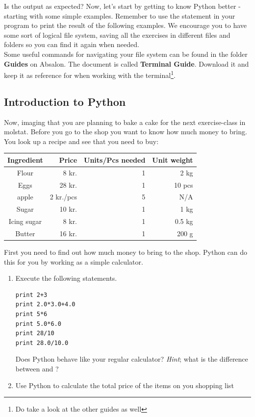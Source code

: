 \documentclass{article}
\begin{document}
Is the output as expected?
%
Now, let's start by getting to know Python better - starting with some simple examples. Remember to use the  statement in your program to print the result of the following examples.
We encourage you to have some sort of logical file system, saving all the exercises in different files and folders so you can find it again when needed. \\

Some useful commands for navigating your file system can be found in the folder \textbf{Guides} on Absalon.  The document is called \textbf{Terminal Guide}.
Download it and keep it as reference for when working with the terminal\footnote{Do take a look at the other guides as well}.\\

\subsection{Introduction to Python}

Now, imaging that you are planning to bake a cake for the next exercise-class in molstat.
Before you go to the shop you want to know how much money  to bring.
You look up a recipe and see that you need to buy:

\vspace{10pt }
 
\begin{center}
    \begin{tabular}{c r r r}
    \hline
    Ingredient & Price & Units/Pcs needed & Unit weight \\
    \hline
    Flour & 8 kr. & 1  & 2 kg \\
    Eggs & 28 kr. & 1  & 10 pcs \\
    apple & 2 kr./pcs & 5   & N/A\\
    Sugar & 10 kr.& 1  & 1 kg \\
    Icing sugar &  8 kr. & 1   & 0.5 kg \\
    Butter & 16 kr. & 1  & 200 g \\
    \end{tabular}
\end{center}

First you need to find out how much money to bring to the shop.
Python can do this for you by working as a simple calculator.

\begin{enumerate}
    \item Execute the following statements.
\begin{lstlisting}
print 2+3
print 2.0*3.0+4.0
print 5*6
print 5.0*6.0
print 28/10
print 28.0/10.0
\end{lstlisting}
    Does Python behave like your regular calculator?
    {\em Hint}; what is the difference between {} and {}? 
    
    \item Use Python  to calculate the total price of the items on you shopping list  
\end{enumerate}
\end{document}
